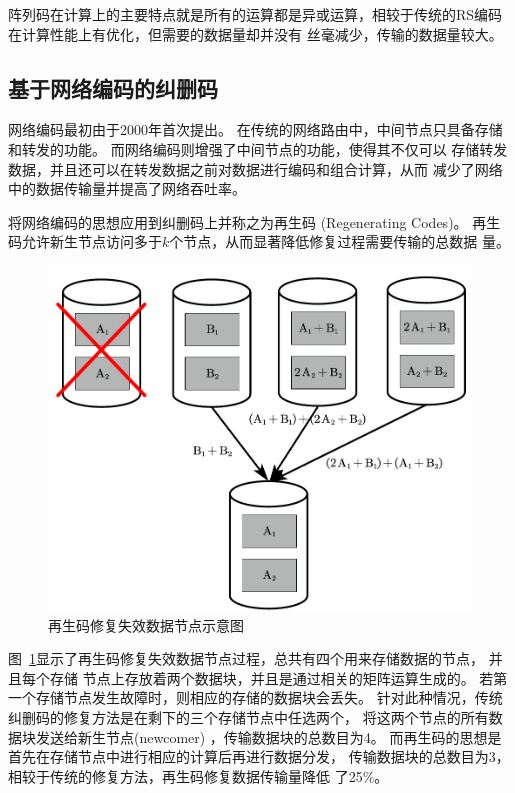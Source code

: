 阵列码在计算上的主要特点就是所有的运算都是异或运算，相较于传统的RS编码在计算性能上有优化，但需要的数据量却并没有
丝毫减少，传输的数据量较大。


\subsection{基于网络编码的纠删码}
网络编码最初由\citet{ahlswede2000network}于2000年首次提出。
在传统的网络路由中，中间节点只具备存储和转发的功能。
而网络编码则增强了中间节点的功能，使得其不仅可以
存储转发数据，并且还可以在转发数据之前对数据进行编码和组合计算，从而
减少了网络中的数据传输量并提高了网络吞吐率。

\citet{dimakis2010network}将网络编码的思想应用到纠删码上并称之为再生码
(Regenerating Codes)。
再生码允许新生节点访问多于$k$个节点，从而显著降低修复过程需要传输的总数据
量。


\begin{figure}[htbp]
	\centering
	\includegraphics [scale=0.6]{figures/1.6.pdf}
	\caption{再生码修复失效数据节点示意图}
	\label{fig:con-1.6}
\end{figure}

图~\ref{fig:con-1.6}显示了再生码修复失效数据节点过程，总共有四个用来存储数据的节点，
并且每个存储
节点上存放着两个数据块，并且是通过相关的矩阵运算生成的。
若第一个存储节点发生故障时，则相应的存储的数据块会丢失。
针对此种情况，传统纠删码的修复方法是在剩下的三个存储节点中任选两个，
将这两个节点的所有数据块发送给新生节点(newcomer)
，传输数据块的总数目为4。
而再生码的思想是首先在存储节点中进行相应的计算后再进行数据分发，
传输数据块的总数目为3，相较于传统的修复方法，再生码修复数据传输量降低
了25\%。


